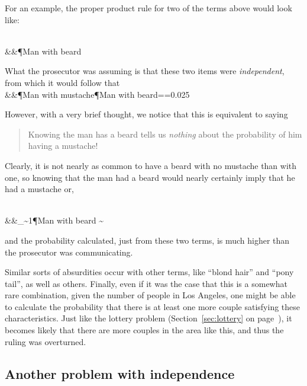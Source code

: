 
For an example, the proper product rule for two of the terms above would look like:

\beqn
{}\\
&&\P{Man with beard}
\eeqn

What the prosecutor was assuming is that these two items were \emph{independent}, from which it would follow that
\beqn
{}\\
&&\P{Man with mustache}\P{Man with beard}==0.025
\eeqn

However, with a very brief thought, we notice that this is equivalent to saying
\begin{quote}
Knowing the man has a beard tells us \emph{nothing} about the probability of him having a mustache!
\end{quote}


Clearly, it is not nearly as common to have a beard with no mustache than with one, so knowing that the man had a beard would nearly certainly imply that he had a mustache or, 

\beqn
{}\\
&&_{\sim 1}\P{Man with beard} \sim {}
\eeqn

and the probability calculated, just from these two terms, is much higher than the prosecutor was communicating.


Similar sorts of absurdities occur with other terms, like ``blond hair'' and ``pony tail'', as well as others.  Finally, even if it was the case that this is a somewhat rare combination, given the number of people in Los Angeles, one might be able to calculate the probability that there is at least one more couple satisfying these characteristics.  Just like the lottery problem (Section~\ref{sec:lottery} on page~\pageref{sec:lottery}), it becomes likely that there are more couples in the area like this, and thus the ruling was overturned.


\subsection{Another problem with independence}

